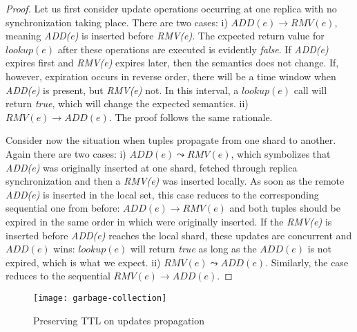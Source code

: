 \begin{proof}
Let us first consider update operations occurring at one replica with no
synchronization taking place. There are two cases: i) $ADD(e) \rightarrow
RMV(e)$, meaning \textit{ADD(e)} is inserted before \textit{RMV(e)}. The
expected return value for $\textit{lookup}(e)$ after these operations are
executed is evidently \textit{false}. If \textit{ADD(e)} expires first and
\textit{RMV(e)} expires later, then the semantics does not change. If, however,
expiration occurs in reverse order, there will be a time window when
\textit{ADD(e)} is present, but \textit{RMV(e)} not. In this interval, a
$\textit{lookup}(e)$ call will return \textit{true}, which will change the
expected semantics. ii) $RMV(e) \rightarrow ADD(e)$. The proof follows the same
rationale.

Consider now the situation when tuples propagate from one shard to another.
Again there are two cases: i) $ADD(e) \leadsto RMV(e)$, which symbolizes that
\textit{ADD(e)} was originally inserted at one shard, fetched through replica
synchronization and then a \textit{RMV(e)} was inserted locally. As soon as the
remote \textit{ADD(e)} is inserted in the local set, this case reduces to the
corresponding sequential one from before: $ADD(e) \rightarrow RMV(e)$ and both
tuples should be expired in the same order in which were originally inserted.
If the \textit{RMV(e)} is inserted before \textit{ADD(e)} reaches the local
shard, these updates are concurrent and $ADD(e)$ wins: $\textit{lookup}(e)$ will
return \textit{true} as long as the $ADD(e)$ is not expired, which is what we
expect. ii) $RMV(e) \leadsto ADD(e)$. Similarly, the case reduces to the
sequential $RMV(e) \rightarrow ADD(e)$.
\end{proof}

\begin{figure}[b!]
  \centering
  \texttt{[image: garbage-collection]}
  \caption{Preserving TTL on updates propagation}
  \label{fig:garbage-collection}
\end{figure}

